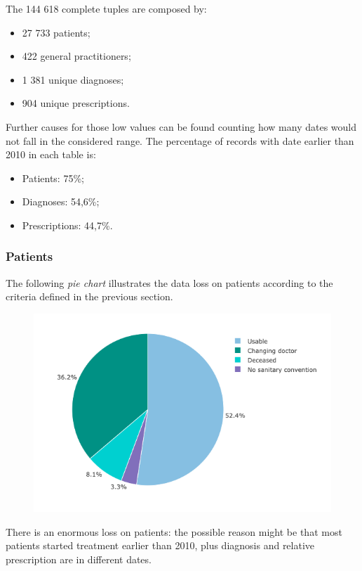 The 144 618 complete tuples are composed by:
\begin{itemize}
	\item 27 733 patients;
	\item 422 general practitioners;
	\item 1 381 unique diagnoses;
	\item 904 unique prescriptions.
\end{itemize}

Further causes for those low values can be found counting how many dates would not fall in the considered range. The percentage of records with date earlier than 2010 in each table is:
\begin{itemize}
	\item Patients: 75\%;
	\item Diagnoses: 54,6\%;
	\item Prescriptions: 44,7\%.
\end{itemize}

\subsubsection{Patients}
The following \textit{pie chart} illustrates the data loss on patients according to the criteria defined in the previous section.
\begin{figure}[h]
	\centering
	\includegraphics[scale=0.6]{images/patients-pie-1.png}
\end{figure}

There is an enormous loss on patients: the possible reason might be that most patients started treatment earlier than 2010, plus diagnosis and relative prescription are in different dates.

